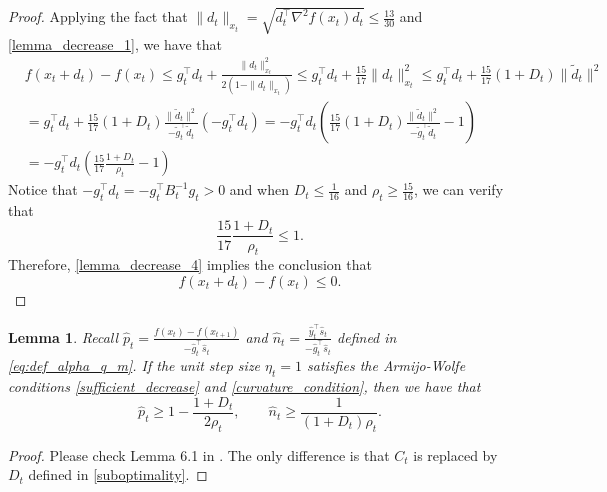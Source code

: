 \documentclass[11pt,letterpaper]{article}
\newcommand\0{{\Vector{0}}}
\newcommand\1{{\Vector{1}}}
\newtheorem{lemma}[theorem]{Lemma}
\numberwithin{assumption}{section}
\numberwithin{definition}{section}
\numberwithin{theorem}{section}
\numberwithin{remark}{section}
\begin{document}
\begin{proof}
    Applying the fact that $\|d_t\|_{x_t} = \sqrt{d_t^\top\nabla^2{f}(x_t)d_t} \leq \frac{13}{30}$ and \eqref{lemma_decrease_1}, we have that
    \begin{equation}\label{lemma_decrease_4}
    \begin{split}
        & f(x_t +d_t) - f(x_t) \leq g_t^\top d_t + \frac{\|d_t\|_{x_t}^2}{2(1 - \|d_t\|_{x_t})} \leq g_t^\top d_t + \frac{15}{17}\|d_t\|_{x_t}^2 \leq g_t^\top d_t + \frac{15}{17}(1 + D_t)\|\tilde{d}_t\|^2 \\
        & = g_t^\top d_t + \frac{15}{17}(1 + D_t)\frac{\|\tilde{d}_t\|^2}{-\tilde{g}_t^\top \tilde{d}_t}(-g_t^\top d_t) = -g_t^\top d_t(\frac{15}{17}(1 + D_t)\frac{\|\tilde{d}_t\|^2}{-\tilde{g}_t^\top \tilde{d}_t} - 1) \\
        & = -g_t^\top d_t(\frac{15}{17}\frac{1 + D_t}{\rho_t} - 1)
    \end{split}
    \end{equation}
    Notice that $-g_t^\top d_t = -g_t^\top B_t^{-1} g_t > 0$ and when $D_t \leq \frac{1}{16}$ and $\rho_t \geq \frac{15}{16}$, we can verify that
    \begin{equation*}
        \frac{15}{17}\frac{1 + D_t}{\rho_t} \leq 1.
    \end{equation*}
    Therefore, \eqref{lemma_decrease_4} implies the conclusion that
    \begin{equation*}
        f(x_t + d_t) - f(x_t) \leq 0.
    \end{equation*}
\end{proof}

\begin{lemma}\label{lem:lower_bound}
    Recall $\hat{p}_t = \frac{f(x_t) - f(x_{t+1})}{-\hat{g}_t^\top \hat{s}_t}$ and $\hat{n}_t= \frac{\hat{y}_t^\top \hat{s}_t}{-\hat{g}_t^\top \hat{s}_t}$ defined in \eqref{eq:def_alpha_q_m}. If the unit step size $\eta_t = 1$ satisfies the Armijo-Wolfe conditions \eqref{sufficient_decrease} and \eqref{curvature_condition}, then we have that
    \begin{equation}\label{eq:lower_bound}
        \hat{p}_t \geq 1 - \frac{1 + D_t}{2\rho_t}, \qquad \hat{n}_t\geq \frac{1}{(1 + D_t)\rho_t}.
    \end{equation}
\end{lemma}

\begin{proof}
    Please check Lemma 6.1 in \cite{qiujiang2024quasinewton}. The only difference is that $C_t$ is replaced by $D_t$ defined in \eqref{suboptimality}.
\end{proof}
\end{document}
